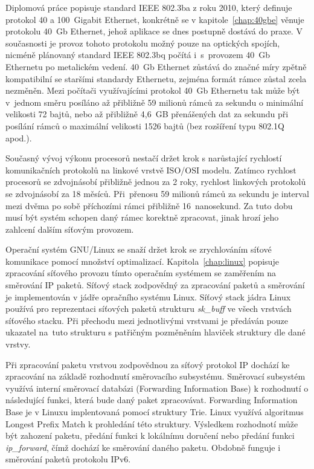 \documentclass[english]{fitthesis} %
\begin{document}
  \maketitle

Diplomová práce popisuje standard IEEE 802.3ba z roku 2010, který definuje protokol 40 a 100~Gigabit Ethernet,
konkrétně se v kapitole~\ref{chap:40gbe} věnuje protokolu 40~Gb Ethernet, jehož aplikace se dnes postupně dostává do praxe.
V současnosti je provoz tohoto protokolu možný pouze na optických spojích, nicméně plánovaný standard IEEE 802.3bq
počítá i~s~provozem 40~Gb Ethernetu po metalickém vedení.
40~Gb Ethernet zůstává do značné míry zpětně kompatibilní se staršími standardy Ethernetu, zejména
formát rámce zůstal zcela nezměněn.
Mezi počítači využívajícími protokol 40~Gb Ethernetu tak může být v~jednom směru posíláno
až přibližně 59 milionů rámců za sekundu o minimální velikosti 72 bajtů,
nebo až přibližně 4,6~GB přenášených dat za sekundu při posílání rámců o maximální velikosti 1526 bajtů (bez rozšíření typu 802.1Q apod.).

Současný vývoj výkonu procesorů nestačí držet krok s narůstající
rychlostí komunikačních protokolů na linkové vrstvě ISO/OSI modelu.
Zatímco rychlost procesorů se zdvojnásobí přibližně jednou za 2 roky, rychlost linkových protokolů se zdvojnásobí za 18 měsíců.
Při~přenosu 59 milionů rámců za sekundu je interval mezi dvěma po sobě příchozími rámci přibližně 16~nanosekund.
Za tuto dobu musí být systém schopen daný rámec korektně zpracovat, jinak hrozí jeho zahlcení dalším síťovým provozem.

Operační systém GNU/Linux se snaží držet krok se zrychlováním síťové komunikace pomocí množství optimalizací.
Kapitola~\ref{chap:linux} popisuje zpracování síťového provozu tímto operačním systémem se zaměřením na směrování IP paketů.
Síťový stack zodpovědný za zpracování paketů a směrování je implementován v jádře opračního systému Linux.
Síťový stack jádra Linux používá pro reprezentaci síťových paketů
strukturu {\it{sk\_buff}} ve všech vrstvách síťového stacku.
Při přechodu mezi jednotlivými vrstvami je předáván pouze ukazatel na~tuto strukturu
s patřičným pozměněním hlaviček struktury dle dané vrstvy.

Při zpracování paketu vrstvou zodpovědnou za síťový protokol IP dochází ke zpracování na základě rozhodnutí směrovacího subsystému.
Směrovací subsystém využívá interní směrovací databázi (Forwarding Information Base) k rozhodnutí o
následující funkci, která bude daný paket zpracovávat.
Forwarding Information Base je v Linuxu implentovaná pomocí struktury Trie.
Linux využívá algoritmus Longest Prefix Match k prohledání této struktury.
Výsledkem rozhodnotí může být zahození paketu, předání funkci k lokálnímu doručení nebo
předání funkci {\it{ip\_forward}}, čímž dochází ke směrování daného paketu.
Obdobně funguje i směrování paketů protokolu IPv6.
\end{document}
